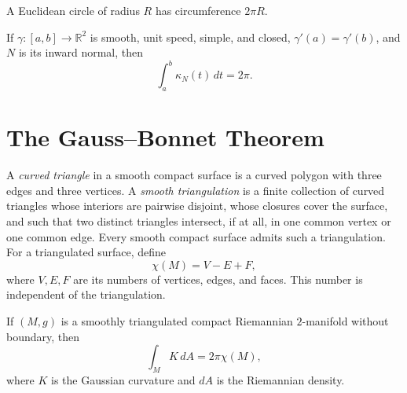 \begin{corollary}
\label{cor:circumference-theorem}

A Euclidean circle of radius $R$ has circumference $2\pi R$.
\end{corollary}

\begin{corollary}
\label{cor:total-curvature-theorem}

If $\gamma:[a,b]\to\mathbb R^2$ is smooth, unit speed, simple, and closed,
$\gamma'(a)=\gamma'(b)$, and $N$ is its inward normal, then
\[
\int_a^b\kappa_N(t)\,dt=2\pi.
\]
\end{corollary}
\section{The Gauss--Bonnet Theorem}

A \emph{curved triangle} in a smooth compact surface is a curved polygon with
three edges and three vertices. A \emph{smooth triangulation} is a finite
collection of curved triangles whose interiors are pairwise disjoint, whose
closures cover the surface, and such that two distinct triangles intersect, if
at all, in one common vertex or one common edge. Every smooth compact surface
admits such a triangulation. For a triangulated surface, define
\[
\chi(M)=V-E+F,
\]
where $V,E,F$ are its numbers of vertices, edges, and faces. This number is
independent of the triangulation.

\begin{theorem}
\label{thm:gauss-bonnet-theorem}

If $(M,g)$ is a smoothly triangulated compact Riemannian $2$-manifold without
boundary, then
\[
\int_MK\,dA=2\pi\chi(M),
\]
where $K$ is the Gaussian curvature and $dA$ is the Riemannian density.
\end{theorem}

